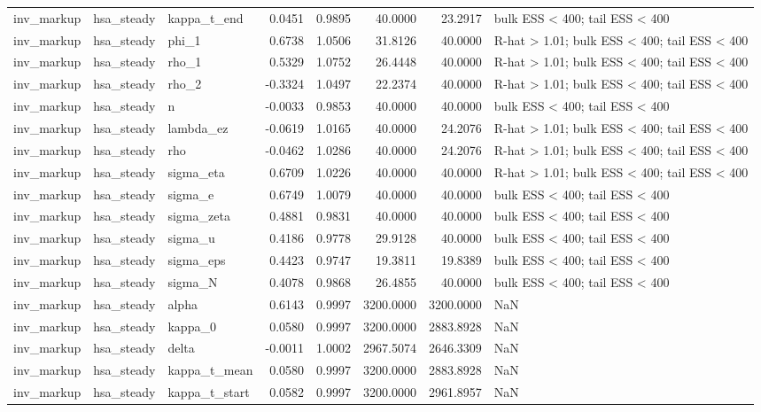 \begin{tabular}{lllrrrrl}
inv\_markup & hsa\_steady & kappa\_t\_end & 0.0451 & 0.9895 & 40.0000 & 23.2917 & bulk ESS < 400; tail ESS < 400 \\
inv\_markup & hsa\_steady & phi\_1 & 0.6738 & 1.0506 & 31.8126 & 40.0000 & R-hat > 1.01; bulk ESS < 400; tail ESS < 400 \\
inv\_markup & hsa\_steady & rho\_1 & 0.5329 & 1.0752 & 26.4448 & 40.0000 & R-hat > 1.01; bulk ESS < 400; tail ESS < 400 \\
inv\_markup & hsa\_steady & rho\_2 & -0.3324 & 1.0497 & 22.2374 & 40.0000 & R-hat > 1.01; bulk ESS < 400; tail ESS < 400 \\
inv\_markup & hsa\_steady & n & -0.0033 & 0.9853 & 40.0000 & 40.0000 & bulk ESS < 400; tail ESS < 400 \\
inv\_markup & hsa\_steady & lambda\_ez & -0.0619 & 1.0165 & 40.0000 & 24.2076 & R-hat > 1.01; bulk ESS < 400; tail ESS < 400 \\
inv\_markup & hsa\_steady & rho & -0.0462 & 1.0286 & 40.0000 & 24.2076 & R-hat > 1.01; bulk ESS < 400; tail ESS < 400 \\
inv\_markup & hsa\_steady & sigma\_eta & 0.6709 & 1.0226 & 40.0000 & 40.0000 & R-hat > 1.01; bulk ESS < 400; tail ESS < 400 \\
inv\_markup & hsa\_steady & sigma\_e & 0.6749 & 1.0079 & 40.0000 & 40.0000 & bulk ESS < 400; tail ESS < 400 \\
inv\_markup & hsa\_steady & sigma\_zeta & 0.4881 & 0.9831 & 40.0000 & 40.0000 & bulk ESS < 400; tail ESS < 400 \\
inv\_markup & hsa\_steady & sigma\_u & 0.4186 & 0.9778 & 29.9128 & 40.0000 & bulk ESS < 400; tail ESS < 400 \\
inv\_markup & hsa\_steady & sigma\_eps & 0.4423 & 0.9747 & 19.3811 & 19.8389 & bulk ESS < 400; tail ESS < 400 \\
inv\_markup & hsa\_steady & sigma\_N & 0.4078 & 0.9868 & 26.4855 & 40.0000 & bulk ESS < 400; tail ESS < 400 \\
inv\_markup & hsa\_steady & alpha & 0.6143 & 0.9997 & 3200.0000 & 3200.0000 & NaN \\
inv\_markup & hsa\_steady & kappa\_0 & 0.0580 & 0.9997 & 3200.0000 & 2883.8928 & NaN \\
inv\_markup & hsa\_steady & delta & -0.0011 & 1.0002 & 2967.5074 & 2646.3309 & NaN \\
inv\_markup & hsa\_steady & kappa\_t\_mean & 0.0580 & 0.9997 & 3200.0000 & 2883.8928 & NaN \\
inv\_markup & hsa\_steady & kappa\_t\_start & 0.0582 & 0.9997 & 3200.0000 & 2961.8957 & NaN \\

\end{tabular}
